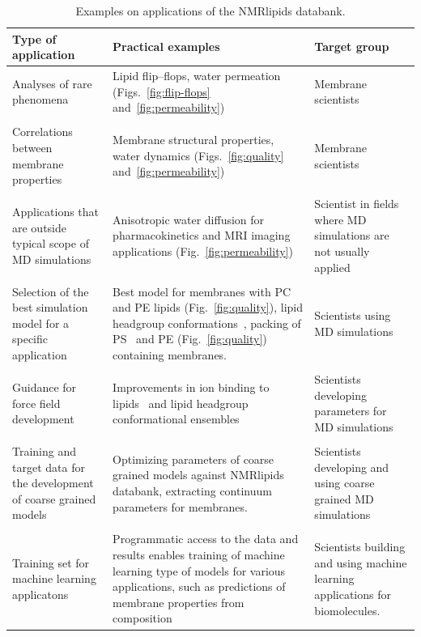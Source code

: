 \documentclass[fleqn,10pt]{wlscirep}
\begin{document}
\begin{table}[t]
    \centering
    \begin{tabular}{p{5.0cm}  p{5.0cm}  p{4.0cm}}
    Type of application     & Practical examples & Target group \\
    \hline
    Analyses of rare phenomena               & Lipid flip--flops, water permeation (Figs.~\ref{fig:flip-flops} and~\ref{fig:permeability}) & Membrane scientists \\
    \\
    Correlations between membrane properties & 
    Membrane structural properties, water dynamics (Figs.~\ref{fig:quality} and~\ref{fig:permeability}) & 
    Membrane scientists \\
    \\
    Applications that are outside typical scope of MD simulations & 
    Anisotropic water diffusion for pharmacokinetics and MRI imaging applications (Fig.~\ref{fig:permeability}) & 
    Scientist in fields where MD simulations are not usually applied \\
    \\
    Selection of the best simulation model for a specific application & 
    Best model for membranes with PC and PE lipids (Fig.~\ref{fig:quality}), lipid headgroup conformations~\cite{bacle21}, 
    packing of PS~\cite{antila22b} and PE (Fig.~\ref{fig:quality}) containing membranes. &
    Scientists using MD simulations \\
    \\
    Guidance for force field development & 
    Improvements in ion binding to lipids~\cite{melcr18,melcr20} and lipid headgroup conformational ensembles~\cite{yu21,dickson22,grote20} &
    Scientists developing parameters for MD simulations \\
    \\
    Training and target data for the development of coarse grained models & 
    Optimizing parameters of coarse grained models against NMRlipids databank, extracting continuum parameters for membranes. &
    Scientists developing and using coarse grained MD simulations \\
    \\
    Training set for machine learning applicatons &
    Programmatic access to the data and results enables training of machine learning type of models for various applications, such as predictions of membrane properties from composition & Scientists building and using machine learning applications for biomolecules.  
    \end{tabular}
    \caption{Examples on applications of the NMRlipids databank.}
    \label{tab:applications}
\end{table}
\end{document}
